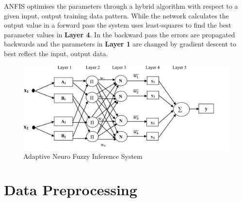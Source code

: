  
 ANFIS optimises the parameters through a hybrid algorithm with respect to a given input, output training data pattern. While the  network calculates the output value in a forward pass the system uses least-squares to find the best parameter values in \textbf{Layer 4}. In the backward pass the errors are propagated backwards and the parameters in \textbf{Layer 1} are changed by gradient descent to best reflect the input, output data.
 
  




\begin{figure}[H]
        \centering
         \includegraphics[width=1\textwidth ]{img/model/gnn_fuzz}      
        \caption{Adaptive Neuro Fuzzy Inference System }
        \label{fig:gnn_fuzz}
\end{figure}





\section{Data Preprocessing}
\label{dataprocessing}

